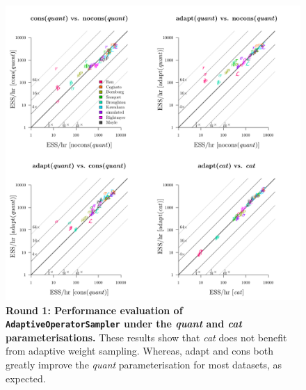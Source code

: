 \documentclass[12pt]{article}
\begin{document}
\begin{figure}[!htb]
\includegraphics[width=\textwidth]{benchmarking/benchmarkingVM/ESS_round1_catquant.pdf}
\caption{\textbf{Round 1: Performance evaluation of \texttt{AdaptiveOperatorSampler} under the \emph{quant} and \emph{cat} parameterisations.}
These results show that \emph{cat} does not benefit from adaptive weight sampling. Whereas, adapt and cons both greatly improve the \emph{quant} parameterisation for most datasets, as expected. }
\end{figure}







%
\end{document}
